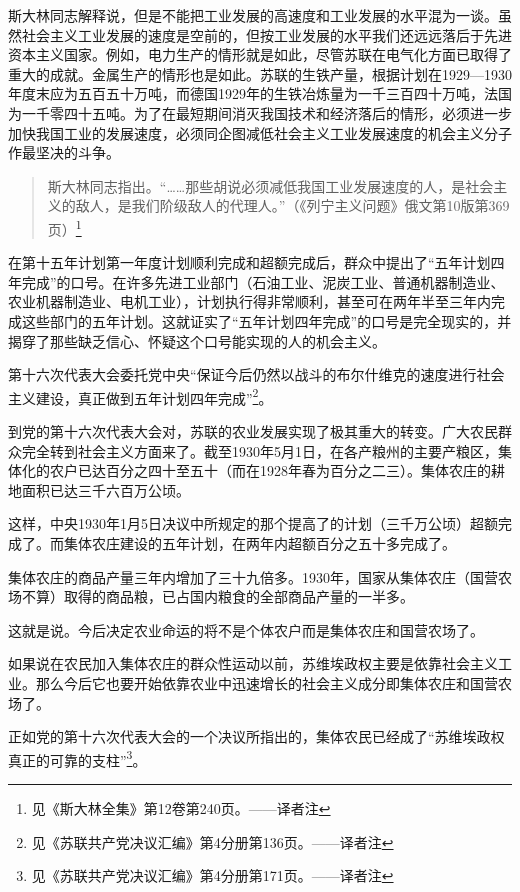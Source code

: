 斯大林同志解释说，但是不能把工业发展的高速度和工业发展的水平混为一谈。虽然社会主义工业发展的速度是空前的，但按工业发展的水平我们还远远落后于先进资本主义国家。例如，电力生产的情形就是如此，尽管苏联在电气化方面已取得了重大的成就。金属生产的情形也是如此。苏联的生铁产量，根据计划在1929—1930年度末应为五百五十万吨，而德国1929年的生铁冶炼量为一千三百四十万吨，法国为一千零四十五吨。为了在最短期间消灭我国技术和经济落后的情形，必须进一步加快我国工业的发展速度，必须同企图减低社会主义工业发展速度的机会主义分子作最坚决的斗争。

\begin{quotation}
斯大林同志指出。“……那些胡说必须减低我国工业发展速度的人，是社会主义的敌人，是我们阶级敌人的代理人。”（《列宁主义问题》俄文第10版第369页）\footnote{见《斯大林全集》第12卷第240页。——译者注}
\end{quotation}

在第十五年计划第一年度计划顺利完成和超额完成后，群众中提出了“五年计划四年完成”的口号。在许多先进工业部门（石油工业、泥炭工业、普通机器制造业、农业机器制造业、电机工业），计划执行得非常顺利，甚至可在两年半至三年内完成这些部门的五年计划。这就证实了“五年计划四年完成”的口号是完全现实的，并揭穿了那些缺乏信心、怀疑这个口号能实现的人的机会主义。

第十六次代表大会委托党中央“保证今后仍然以战斗的布尔什维克的速度进行社会主义建设，真正做到五年计划四年完成”\footnote{见《苏联共产党决议汇编》第4分册第136页。——译者注}。

到党的第十六次代表大会对，苏联的农业发展实现了极其重大的转变。广大农民群众完全转到社会主义方面来了。截至1930年5月1日，在各产粮州的主要产粮区，集体化的农户已达百分之四十至五十（而在1928年春为百分之二三）。集体农庄的耕地面积已达三千六百万公顷。

这样，中央1930年1月5日决议中所规定的那个提高了的计划（三千万公顷）超额完成了。而集体农庄建设的五年计划，在两年内超额百分之五十多完成了。

集体农庄的商品产量三年内增加了三十九倍多。1930年，国家从集体农庄（国营农场不算）取得的商品粮，已占国内粮食的全部商品产量的一半多。

这就是说。今后决定农业命运的将不是个体农户而是集体农庄和国营农场了。

如果说在农民加入集体农庄的群众性运动以前，苏维埃政权主要是依靠社会主义工业。那么今后它也要开始依靠农业中迅速增长的社会主义成分即集体农庄和国营农场了。

正如党的第十六次代表大会的一个决议所指出的，集体农民已经成了“苏维埃政权真正的可靠的支柱”\footnote{见《苏联共产党决议汇编》第4分册第171页。——译者注}。


